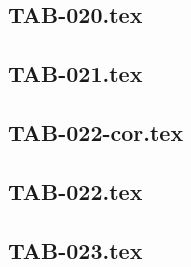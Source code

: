 \renewcommand{\xxexo}{TAB-020.tex} 
\subsection*{\xxexo} 
\graphicspath{{../../exostableaux/equadiffs/\xxexo/}}
 
 
\renewcommand{\xxexo}{TAB-021.tex} 
\subsection*{\xxexo} 
\graphicspath{{../../exostableaux/equadiffs/\xxexo/}}
 
 
\renewcommand{\xxexo}{TAB-022-cor.tex} 
\subsection*{\xxexo} 
\graphicspath{{../../exostableaux/equadiffs/\xxexo/}}
 
 
\renewcommand{\xxexo}{TAB-022.tex} 
\subsection*{\xxexo} 
\graphicspath{{../../exostableaux/equadiffs/\xxexo/}}
 
 
\renewcommand{\xxexo}{TAB-023.tex} 
\subsection*{\xxexo} 
\graphicspath{{../../exostableaux/equadiffs/\xxexo/}}
 
 
